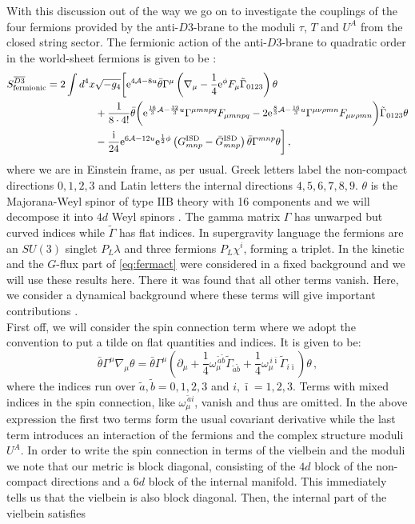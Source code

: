 \documentclass[a4paper,12pt]{report}
\newcommand{\be}{\begin{equation}}
\newcommand{\ee}{\end{equation}}
\newcommand{\bea}{\begin{equation}\begin{aligned}}
\newcommand{\eea}{\end{aligned}\end{equation}}
\def\rmi{{\rm i}}
\def\rme{{\rm e}}
\def\ib{{\bar \imath}}
\begin{document}
With this discussion out of the way we go on to investigate the couplings of the four fermions provided by the anti-$D3$-brane to the moduli $\tau$, $T$ and $U^A$ from the closed string sector. The fermionic action of the anti-$D3$-brane \cite{Bergshoeff:2015jxa,GarciadelMoral:2017vnz,Grana:2002tu,McGuirk:2012sb} to quadratic order in the world-sheet fermions is given to be \cite{Bergshoeff:2015jxa,Martucci:2005rb,Bergshoeff:2005yp}:
\bea 
S_{\text{fermionic}}^{\overline{D3}} = 2 \int d^4x & \sqrt{-g_4} \bigg[ \rme^{4\mathcal{A} - 8u} \bar{\theta}\Gamma^\mu \left( \nabla_\mu - \frac{1}{4} \rme^\phi F_\mu \tilde{\Gamma}_{0123}\right)\theta\\
&+ \frac{1}{8\cdot 4!} \bar{\theta} \bigg(\rme^{\frac{16}{3} \mathcal{A} - \frac{32}{3} u} \Gamma^{\mu mnpq}F_{\mu mnpq} - 2 \rme^{\frac{8}{3} \mathcal{A} - \frac{16}{3} u} \Gamma^{\mu\nu\rho mn} F_{\mu\nu\rho mn}\bigg) \tilde{\Gamma}_{0123}\theta\\
&- \frac{\rmi}{24} \rme^{6\mathcal{A} - 12u} \rme^{\frac{1}{2} \phi} \left( G_{mnp}^{\text{ISD}} - \bar{G}_{mnp}^{\text{ISD}}\right) \bar{\theta} \Gamma^{mnp} \theta \bigg]\,,
\label{eq:fermact}
\eea
where we are in Einstein frame, as per usual. Greek letters label the non-compact directions $0,1,2,3$ and Latin letters the internal directions $4,5,6,7,8,9$. $\theta$ is the Majorana-Weyl spinor of type IIB theory with 16 components and we will decompose it into $4d$ Weyl spinors \cite{Bergshoeff:2015jxa,Grana:2002tu}. The gamma matrix $\Gamma$ has unwarped but curved indices while $\tilde{\Gamma}$ has flat indices. In supergravity language \cite{Freedman:2012zz} the fermions are an $SU(3)$ singlet $P_L\lambda$ and three fermions $P_L\chi^i$, forming a triplet. In \cite{Bergshoeff:2015jxa} the kinetic and the $G$-flux part of \eqref{eq:fermact} were considered in a fixed background and we will use these results here. There it was found that all other terms vanish. Here, we consider a dynamical background where these terms will give important contributions \cite{Cribiori:2019hod}.\\
First off, we will consider the spin connection term where we adopt the convention to put a tilde on flat quantities and indices. It is given to be:
\be
\bar{\theta} \Gamma^\mu \nabla_\mu \theta = \bar{\theta} \Gamma^\mu \left(\partial_\mu + \frac{1}{4} \omega_\mu^{\,\tilde{a}\tilde{b}} \tilde{\Gamma}_{\tilde{a}\tilde{b}} + \frac{1}{4} \omega_\mu^{\,i\ib} \tilde{\Gamma}_{i\ib}\right) \theta\,,
\ee
where the indices run over $\tilde{a},\tilde{b} = 0,1,2,3$ and $i,\ib=1,2,3$. Terms with mixed indices in the spin connection, like $\omega_\mu^{\,\tilde{a}i}$, vanish and thus are omitted. In the above expression the first two terms form the usual covariant derivative while the last term introduces an interaction of the fermions and the complex structure moduli $U^A$. In order to write the spin connection in terms of the vielbein and the moduli we note that our metric is block diagonal, consisting of the $4d$ block of the non-compact directions and a $6d$ block of the internal manifold. This immediately tells us that the vielbein is also block diagonal. Then, the internal part of the vielbein satisfies
\end{document}
